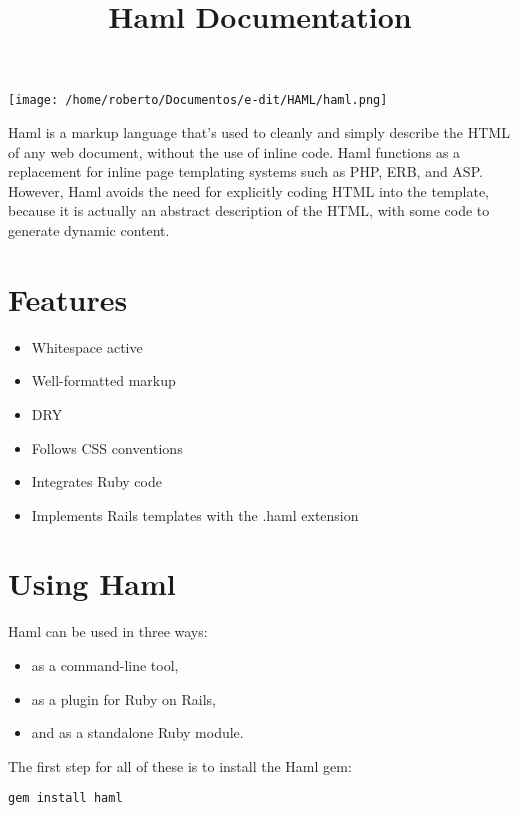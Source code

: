 \documentclass[9pt]{article}
\title{ Haml Documentation }
\begin{document}
\begin{titlepage}
\pagestyle{plain}
\begin{center}
\vspace*{0.3\textheight}
\texttt{[image: /home/roberto/Documentos/e-dit/HAML/haml.png]}\\[5pt]
\vfill
\end{center}
\end{titlepage}

\tableofcontents

\newpage
\setcounter{page}{1}

 Haml is a markup language that’s used to cleanly and simply describe the HTML of any web document, without the use of inline code. Haml functions as a replacement for inline page templating systems such as PHP, ERB, and ASP. However, Haml avoids the need for explicitly coding HTML into the template, because it is actually an abstract description of the HTML, with some code to generate dynamic content.
\section{Features}
\begin{itemize}
\item Whitespace active
\item Well-formatted markup
\item DRY
\item Follows CSS conventions
\item Integrates Ruby code
\item Implements Rails templates with the .haml extension

\end{itemize}
\section{Using Haml}


 Haml can be used in three ways:
\begin{itemize}
\item as a command-line tool,
\item as a plugin for Ruby on Rails,
\item and as a standalone Ruby module.

\end{itemize}


 The first step for all of these is to install the Haml gem:
\begin{verbatim}
gem install haml
\end{verbatim}
\end{document}
